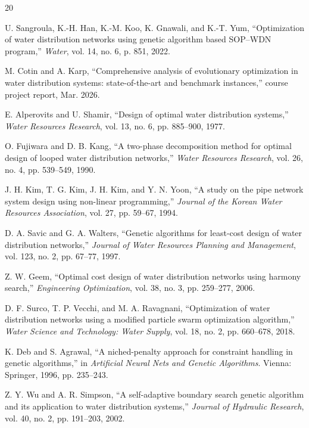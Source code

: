 \documentclass[conference]{IEEEtran}
\begin{document}

\begin{thebibliography}{20}

U. Sangroula, K.-H. Han, K.-M. Koo, K. Gnawali, and K.-T. Yum, ``Optimization of water distribution networks using genetic algorithm based SOP--WDN program,'' \emph{Water}, vol. 14, no. 6, p. 851, 2022.

M. Cotin and A. Karp, ``Comprehensive analysis of evolutionary optimization in water distribution systems: state-of-the-art and benchmark instances,'' course project report, Mar. 2026.

E. Alperovits and U. Shamir, ``Design of optimal water distribution systems,'' \emph{Water Resources Research}, vol. 13, no. 6, pp. 885--900, 1977.

O. Fujiwara and D. B. Kang, ``A two-phase decomposition method for optimal design of looped water distribution networks,'' \emph{Water Resources Research}, vol. 26, no. 4, pp. 539--549, 1990.

J. H. Kim, T. G. Kim, J. H. Kim, and Y. N. Yoon, ``A study on the pipe network system design using non-linear programming,'' \emph{Journal of the Korean Water Resources Association}, vol. 27, pp. 59--67, 1994.

D. A. Savic and G. A. Walters, ``Genetic algorithms for least-cost design of water distribution networks,'' \emph{Journal of Water Resources Planning and Management}, vol. 123, no. 2, pp. 67--77, 1997.

Z. W. Geem, ``Optimal cost design of water distribution networks using harmony search,'' \emph{Engineering Optimization}, vol. 38, no. 3, pp. 259--277, 2006.

D. F. Surco, T. P. Vecchi, and M. A. Ravagnani, ``Optimization of water distribution networks using a modified particle swarm optimization algorithm,'' \emph{Water Science and Technology: Water Supply}, vol. 18, no. 2, pp. 660--678, 2018.

K. Deb and S. Agrawal, ``A niched-penalty approach for constraint handling in genetic algorithms,'' in \emph{Artificial Neural Nets and Genetic Algorithms}. Vienna: Springer, 1996, pp. 235--243.

Z. Y. Wu and A. R. Simpson, ``A self-adaptive boundary search genetic algorithm and its application to water distribution systems,'' \emph{Journal of Hydraulic Research}, vol. 40, no. 2, pp. 191--203, 2002.


\end{thebibliography}
\end{document}
